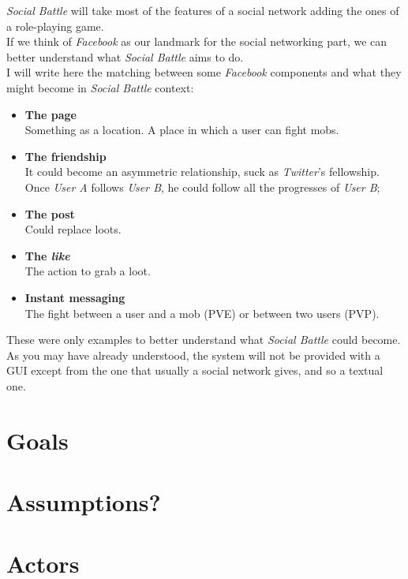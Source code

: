 		\noindent\textit{Social Battle} will take most of the features of a social network adding the 
		ones of a role-playing game.\\
		If we think of \textit{Facebook} as our landmark for the social networking part, we can 
		better understand what \textit{Social Battle} aims to do.\\
		I will write here the matching between some \textit{Facebook} components and what 
		they might become in \textit{Social Battle} context:
		\begin{itemize}
			\item \textbf{The page}\\
			Something as a location. A place in which a user can fight mobs.

			\item \textbf{The friendship}\\
			It could become an asymmetric relationship, suck as \textit{Twitter}'s fellowship.
			Once \textit{User A} follows \textit{User B}, he could follow all the progresses
			of \textit{User B};

			\item \textbf{The post}\\
			Could replace loots.

			\item \textbf{The \textit{like}}\\
			The action to grab a loot.

			\item \textbf{Instant messaging}\\
			The fight between a user and a mob (PVE) or between two users (PVP).
		\end{itemize}

		\noindent These were only examples to better understand what \textit{Social Battle} could become.\\
		As you may have already understood, the system will not be provided with a GUI except from the one 
		that usually a social network gives, and so a textual one.

	\section{Goals}

	\section{Assumptions?}

	\section{Actors}